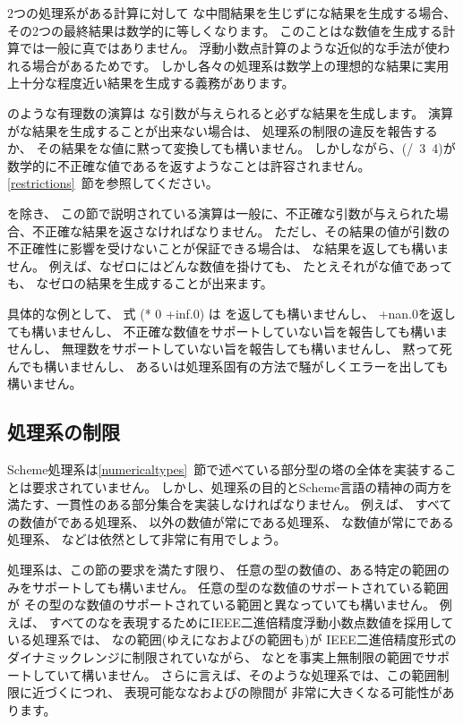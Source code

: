 \vest 2つの処理系がある計算に対して
な中間結果を生じずにな結果を生成する場合、
その2つの最終結果は数学的に等しくなります。
このことはな数値を生成する計算では一般に真ではありません。
浮動小数点計算のような近似的な手法が使われる場合があるためです。
しかし各々の処理系は数学上の理想的な結果に実用上十分な程度近い結果を生成する義務があります。

\vest {\cf +}のような有理数の演算は
な引数が与えられると必ずな結果を生成します。
演算がな結果を生成することが出来ない場合は、
処理系の制限の違反を報告するか、
その結果をな値に黙って変換しても構いません。
しかしながら、{\cf (/~3~4)}が数学的に不正確な値である{}を返すようなことは許容されません。
\ref{restrictions}~節を参照してください。

\vest {}を除き、
この節で説明されている演算は一般に、不正確な引数が与えられた場合、不正確な結果を返さなければなりません。
ただし、その結果の値が引数の不正確性に影響を受けないことが保証できる場合は、
な結果を返しても構いません。
例えば、なゼロにはどんな数値を掛けても、
たとえそれがな値であっても、
なゼロの結果を生成することが出来ます。

具体的な例として、
式 {\cf (* 0 +inf.0)} は
{}を返しても構いませんし、
{\cf +nan.0}を返しても構いませんし、
不正確な数値をサポートしていない旨を報告しても構いませんし、
無理数をサポートしていない旨を報告しても構いませんし、
黙って死んでも構いませんし、
あるいは処理系固有の方法で騒がしくエラーを出しても構いません。

\subsection{処理系の制限}

\label{restrictions}

\vest Scheme処理系は\ref{numericaltypes}~節で述べている部分型の塔の全体を実装することは要求されていません。
しかし、処理系の目的とScheme言語の精神の両方を満たす、一貫性のある部分集合を実装しなければなりません。
例えば、
すべての数値がである処理系、
以外の数値が常にである処理系、
な数値が常にである処理系、
などは依然として非常に有用でしょう。

\vest 処理系は、この節の要求を満たす限り、
任意の型の数値の、ある特定の範囲のみをサポートしても構いません。
任意の型のな数値のサポートされている範囲が
その型のな数値のサポートされている範囲と異なっていても構いません。
例えば、
すべてのなを表現するためにIEEE二進倍精度浮動小数点数値を採用している処理系では、
なの範囲(ゆえになおよびの範囲も)が
IEEE二進倍精度形式のダイナミックレンジに制限されていながら、
なとを事実上無制限の範囲でサポートしていて構いません。
さらに言えば、そのような処理系では、この範囲制限に近づくにつれ、
表現可能ななおよびの隙間が
非常に大きくなる可能性があります。

